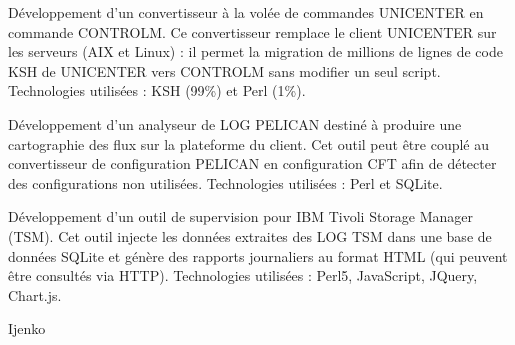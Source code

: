 \documentclass{cv}
\newlength{\companySectionIndentLength}
\newlength{\interSectionTitleContentLength}
\newenvironment{sectionComponent}{
   \vspace{\interSectionTitleContentLength}\par%
}{%
   \par%
}%
\newcommand{\sectionCompany}[1]{ 
   \vspace{\interSectionTitleContentLength}\par%
   \hspace{\companySectionIndentLength}\begin{tcolorbox}[notitle,
                      nobeforeafter, %
                      bottomrule=2pt,
                      toprule=0pt,
                      leftrule=0pt,
                      rightrule=0pt,
                      top=0pt,
                      bottom=0pt,
                      halign=left,
                      left=0pt,
                      valign=center,
                      colback={colorCompanySection},
                      width=\textwidth-\companySectionIndentLength]%
       #1%
   \end{tcolorbox}%
   \par%
}%
\newenvironment{realisationEnv}{
   \setlength{\parskip}{1em}
}{%
   \par%
}
\begin{document}
\begin{sectionComponent}
\begin{realisationEnv}
         Développement d'un convertisseur à la volée de commandes UNICENTER en commande CONTROLM. Ce convertisseur remplace le client UNICENTER sur
         les serveurs (AIX et Linux) : il permet la migration de millions de lignes de code KSH de UNICENTER vers CONTROLM sans modifier un seul script.
         Technologies utilisées : KSH (99\%) et Perl (1\%).
   
         Développement d'un analyseur de LOG PELICAN destiné à produire une cartographie des flux sur la plateforme du client. Cet outil peut être
         couplé au convertisseur de configuration PELICAN en configuration CFT afin de détecter des configurations non utilisées. Technologies
         utilisées : Perl et SQLite.
   
         Développement d'un outil de supervision pour IBM Tivoli Storage Manager (TSM). Cet outil injecte les données extraites des LOG TSM dans une
         base de données SQLite et génère des rapports journaliers au format HTML (qui peuvent être consultés via HTTP). Technologies utilisées :
         Perl5, JavaScript, JQuery, Chart.js.
   
       \end{realisationEnv}
   \end{sectionComponent}

   \begin{sectionComponent}
      \sectionCompany{Ijenko}


   \end{sectionComponent}
\end{document}
